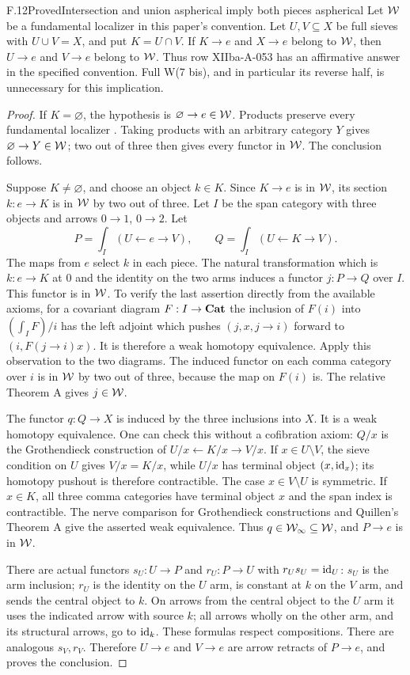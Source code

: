 \begin{claim}{F.12}{Proved}{Intersection and union aspherical imply both pieces aspherical}
Let $\mathcal{W}$ be a fundamental localizer in this paper's convention. Let
$U,V\subseteq X$ be full sieves with $U\cup V=X$, and put $K=U\cap V$.
If $K\to e$ and $X\to e$ belong to $\mathcal{W}$, then $U\to e$ and $V\to e$
belong to $\mathcal{W}$. Thus row XIIba-A-053 has an affirmative answer in the
specified convention. Full W(7 bis), and in particular its reverse half,
is unnecessary for this implication.
\end{claim}
\begin{proof}
If $K=\varnothing$, the hypothesis is $\varnothing\to e\in\mathcal{W}$.
Products preserve every fundamental localizer
\citep[Sorites 3.3.8(2)]{RootCisinski2006}. Taking products with an arbitrary
category $Y$ gives $\varnothing\to Y\in\mathcal{W}$; two out of three then
gives every functor in $\mathcal{W}$. The conclusion follows.

Suppose $K\ne\varnothing$, and choose an object $k\in K$. Since
$K\to e$ is in $\mathcal{W}$, its section $k:e\to K$ is in $\mathcal{W}$ by two out
of three. Let $I$ be the span category with three objects and arrows
$0\to1$, $0\to2$. Let
\[
 P=\int_I(U\leftarrow e\to V),\qquad
 Q=\int_I(U\leftarrow K\to V).
\]
The maps from $e$ select $k$ in each piece. The natural transformation
which is $k:e\to K$ at $0$ and the identity on the two arms induces a
functor $j:P\to Q$ over $I$. This functor is in $\mathcal{W}$. To verify the
last assertion directly from the available axioms, for a covariant
diagram $F:I\to\mathbf{Cat}$ the inclusion of $F(i)$ into
$(\int_I F)/i$ has the left adjoint which pushes
$(j,x,j\to i)$ forward to $(i,F(j\to i)x)$. It is therefore a weak
homotopy equivalence. Apply this observation to the two diagrams.
The induced functor on each comma category over $i$ is in $\mathcal{W}$ by two
out of three, because the map on $F(i)$ is. The relative Theorem A
gives $j\in\mathcal{W}$.

The functor $q:Q\to X$ is induced by the three inclusions into $X$.
It is a weak homotopy equivalence. One can check this without a
cofibration axiom: $Q/x$ is the Grothendieck construction of
$U/x\leftarrow K/x\to V/x$. If $x\in U\setminus V$, the sieve
condition on $U$ gives $V/x=K/x$, while $U/x$ has terminal object
$(x,\mathrm{id}_x)$; its homotopy pushout is therefore contractible. The case
$x\in V\setminus U$ is symmetric. If $x\in K$, all three comma
categories have terminal object $x$ and the span index is contractible.
The nerve comparison for Grothendieck constructions and Quillen's
Theorem A give the asserted weak equivalence. Thus $q\in\mathcal{W}_{\infty}
\subseteq\mathcal{W}$, and $P\to e$ is in $\mathcal{W}$.

There are actual functors $s_U:U\to P$ and $r_U:P\to U$ with
$r_Us_U=\mathrm{id}_U$: $s_U$ is the arm inclusion; $r_U$ is the identity on
the $U$ arm, is constant at $k$ on the $V$ arm, and sends the central
object to $k$. On arrows from the central object to the $U$ arm it
uses the indicated arrow with source $k$; all arrows wholly on the
other arm, and its structural arrows, go to $\mathrm{id}_k$. These formulas
respect compositions. There are analogous $s_V,r_V$. Therefore
$U\to e$ and $V\to e$ are arrow retracts of $P\to e$, and
 proves the conclusion.
\end{proof}


